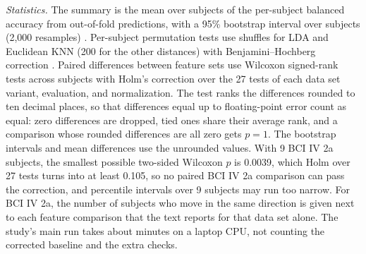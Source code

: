 \emph{Statistics.} The summary is the mean over subjects of the per-subject balanced accuracy from out-of-fold predictions, with a 95\% bootstrap interval over subjects (2,000 resamples) \cite{efron1993}. Per-subject permutation tests use  shuffles for LDA and Euclidean KNN (200 for the other distances) with Benjamini--Hochberg correction \cite{benjamini1995}. Paired differences between feature sets use Wilcoxon signed-rank tests \cite{wilcoxon1945} across subjects with Holm's correction \cite{holm1979} over the 27 tests of each data set variant, evaluation, and normalization. The test ranks the differences rounded to ten decimal places, so that differences equal up to floating-point error count as equal: zero differences are dropped, tied ones share their average rank, and a comparison whose rounded differences are all zero gets $p = 1$. The bootstrap intervals and mean differences use the unrounded values. With 9 BCI IV 2a subjects, the smallest possible two-sided Wilcoxon $p$ is 0.0039, which Holm over 27 tests turns into at least 0.105, so no paired BCI IV 2a comparison can pass the correction, and percentile intervals over 9 subjects may run too narrow. For BCI IV 2a, the number of subjects who move in the same direction is given next to each feature comparison that the text reports for that data set alone. The study's main run takes about  minutes on a laptop CPU, not counting the corrected baseline and the extra checks.
